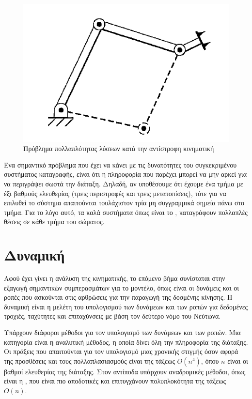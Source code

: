 \begin{figure}[H]
    \centering
    \includegraphics[width=.7\textwidth, height=.29\textheight, keepaspectratio]{fig/ik-multiple-solutions.png}
    \caption{Πρόβλημα πολλαπλότητας λύσεων κατά την αντίστροφη κινηματική \cite{craig95}}
    \label{fig:ik-multiple-solutions}
\end{figure}

Ένα σημαντικό πρόβλημα που έχει να κάνει με τις δυνατότητες του συγκεκριμένου συστήματος καταγραφής, είναι ότι η πληροφορία που παρέχει μπορεί να μην αρκεί για να περιγράψει σωστά την διάταξη. Δηλαδή, αν υποθέσουμε ότι έχουμε ένα τμήμα με έξι βαθμούς ελευθερίας (τρεις περιστροφές και τρεις μετατοπίσεις), τότε για να επιλυθεί το σύστημα απαιτούνται τουλάχιστον τρία μη συγγραμμικά σημεία πάνω στο τμήμα. Για το λόγο αυτό, τα καλά συστήματα όπως είναι το , καταγράφουν πολλαπλές θέσεις σε κάθε τμήμα του σώματος.

\section{Δυναμική}

Αφού έχει γίνει η ανάλυση της κινηματικής, το επόμενο βήμα συνίσταται στην εξαγωγή σημαντικών συμπερασμάτων για το μοντέλο, όπως είναι οι δυνάμεις και οι ροπές που ασκούνται στις αρθρώσεις για την παραγωγή της δοσμένης κίνησης. Η δυναμική είναι η μελέτη του υπολογισμού των δυνάμεων και των ροπών για δεδομένες τροχιές, ταχύτητες και επιταχύνσεις με βάση τον δεύτερο νόμο του Νεύτωνα.

Υπάρχουν διάφοροι μέθοδοι για τον υπολογισμό των δυνάμεων και των ροπών. Μια κατηγορία είναι η αναλυτική μέθοδος, η οποία δίνει όλη την πληροφορία της διάταξης. Οι πράξεις που απαιτούνται για τον υπολογισμό μιας χρονικής στιγμής όσον αφορά της προσθέσεις και τους πολλαπλασιασμούς είναι της τάξεως $O(n^4)$, όπου $n$ είναι οι βαθμοί ελευθερίας της διάταξης. Στον αντίποδα υπάρχουν αναδρομικές μέθοδοι, όπως είναι η , που είναι πιο αποδοτικές και επιτυγχάνουν πολυπλοκότητα της τάξεως $O(n)$.

